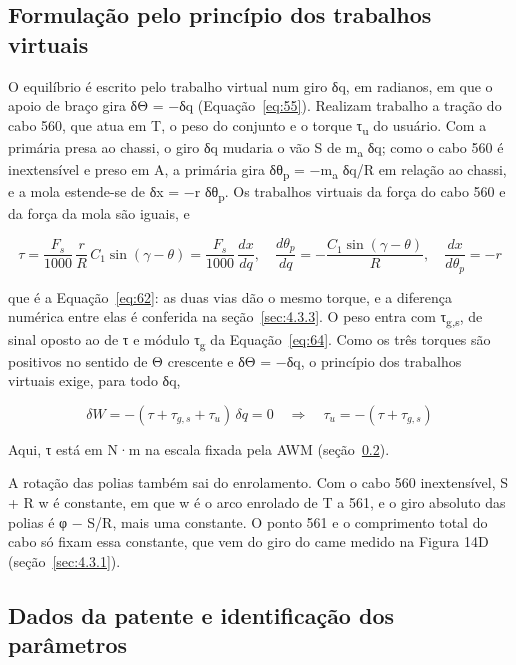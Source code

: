 \subsection{Formulação pelo princípio dos trabalhos virtuais}\label{sec:3.3.9}

O equilíbrio é escrito pelo trabalho virtual num giro δq, em radianos, em que o apoio de braço gira δΘ = −δq (Equação~\eqref{eq:55}). Realizam trabalho a tração do cabo 560, que atua em T, o peso do conjunto e o torque τ\textsubscript{u} do usuário. Com a primária presa ao chassi, o giro δq mudaria o vão S de m\textsubscript{a} δq; como o cabo 560 é inextensível e preso em A, a primária gira δθ\textsubscript{p} = −m\textsubscript{a} δq/R em relação ao chassi, e a mola estende-se de δx = −r δθ\textsubscript{p}. Os trabalhos virtuais da força do cabo 560 e da força da mola são iguais, e

\begin{equation}
  \tau = \frac{F_{s}}{1000}\,\frac{r}{R}\, C_{1}\sin{(\gamma - \theta)} = \frac{F_{s}}{1000}\,\frac{dx}{dq},\quad\frac{d\theta_{p}}{dq} = - \frac{C_{1}\sin{(\gamma - \theta)}}{R},\quad\frac{dx}{d\theta_{p}} = - r
  \label{eq:65}
\end{equation}

que é a Equação~\eqref{eq:62}: as duas vias dão o mesmo torque, e a diferença numérica entre elas é conferida na seção~\ref{sec:4.3.3}. O peso entra com τ\textsubscript{g,s}, de sinal oposto ao de τ e módulo τ\textsubscript{g} da Equação~\eqref{eq:64}. Como os três torques são positivos no sentido de Θ crescente e δΘ = −δq, o princípio dos trabalhos virtuais exige, para todo δq,

\begin{equation}
  \delta W = - (\tau + \tau_{g,s} + \tau_{u})\,\delta q = 0\quad \Rightarrow \quad\tau_{u} = - (\tau + \tau_{g,s})
  \label{eq:66}
\end{equation}

Aqui, τ está em N·m na escala fixada pela AWM (seção~\ref{sec:3.3.10}).

A rotação das polias também sai do enrolamento. Com o cabo 560 inextensível, S + R w é constante, em que w é o arco enrolado de T a 561, e o giro absoluto das polias é φ − S/R, mais uma constante. O ponto 561 e o comprimento total do cabo só fixam essa constante, que vem do giro do came medido na Figura 14D (seção~\ref{sec:4.3.1}).

\subsection{Dados da patente e identificação dos parâmetros}\label{sec:3.3.10}

